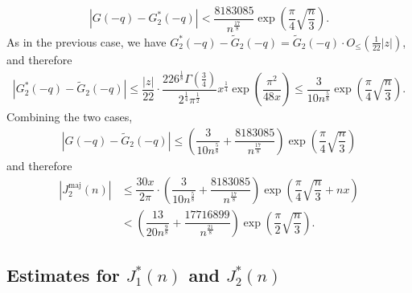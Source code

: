 \documentclass[11pt,reqno]{amsart}
\theoremstyle{definition}
\theoremstyle{plain}
\theoremstyle{named}
\numberwithin{equation}{section}
\theoremstyle{example}
\def\lp{\left(}
\def\rp{\right)}
\begin{document}
\begin{align*}
	\left| G(-q) - G_2^*(-q) \right| < \dfrac{8183085}{n^{\frac{17}{8}}} \exp\lp \dfrac{\pi}{4} \sqrt{\dfrac{n}{3}} \rp.
\end{align*}
As in the previous case, we have $G_2^*(-q) - \widetilde{G}_2(-q) = \widetilde{G}_2(-q) \cdot O_{\leq}\lp \frac{1}{22} |z| \rp$, and therefore
\begin{align*}
	\left|G_2^*(-q) - \widetilde{G}_2(-q)\right| \leq \dfrac{|z|}{22} \cdot \dfrac{226^{\frac 18} \Gamma\lp \frac 34 \rp}{2^{\frac 14} \pi^{\frac 12}} x^{\frac 14} \exp\lp \dfrac{\pi^2}{48x} \rp \leq \dfrac{3}{10 n^{\frac 58}} \exp\lp \dfrac{\pi}{4} \sqrt{\dfrac{n}{3}} \rp.
\end{align*}
Combining the two cases,
\begin{align*}
	\left|G(-q) - \widetilde{G}_2(-q)\right| \leq \lp \dfrac{3}{10 n^{\frac 58}} + \dfrac{8183085}{n^{\frac{17}{8}}} \rp \exp\lp \dfrac{\pi}{4} \sqrt{\dfrac{n}{3}} \rp
\end{align*}
and therefore
\begin{align*}
	\left|J^{\text{maj}}_2(n)\right| &\leq \dfrac{30x}{2\pi} \cdot \lp \dfrac{3}{10 n^{\frac 58}} + \dfrac{8183085}{n^{\frac{17}{8}}} \rp \exp\lp \dfrac{\pi}{4} \sqrt{\dfrac{n}{3}} + nx \rp \\ &< \lp \dfrac{13}{20 n^{\frac 98}} + \dfrac{17716899}{n^{\frac{21}{8}}} \rp \exp\lp \dfrac{\pi}{2} \sqrt{\dfrac{n}{3}} \rp.
\end{align*}

\subsection{Estimates for $J_1^*(n)$ and $J_2^*(n)$}
\end{document}
